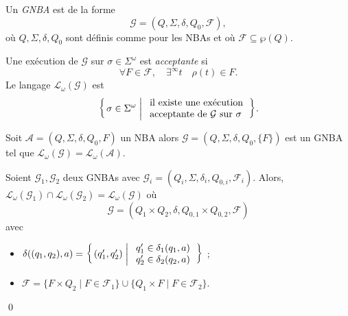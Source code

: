 \documentclass[./main]{subfiles}
\begin{document}
  \begin{defn}
    Un \textit{GNBA} est de la forme
    \[
    \mathcal{G} = (Q, \Sigma, \delta, Q_0, \mathcal{F})
    ,\]
    où $Q, \Sigma, \delta, Q_0$ sont définis comme pour les NBAs et où $\mathcal{F} \subseteq \wp(Q)$.

    Une exécution de $\mathcal{G}$ sur $\sigma \in \Sigma^\omega$ est \textit{acceptante} si
    \[
    \forall F \in \mathcal{F}, \quad \exists^\infty t \quad \rho(t) \in F
    .\]
    Le langage $\mathcal{L}_\omega(\mathcal{G})$ est 
    \[
    \mleft\{\,
    \sigma \in \Sigma^\omega\;\middle|\;
    \begin{array}{l}
      \text{il existe une exécution}\\
      \text{acceptante de $\mathcal{G}$ sur $\sigma$}
    \end{array}\,\mright\} 
    .\] 
  \end{defn}

  \begin{rmk}
    Soit $\mathcal{A} = (Q, \Sigma, \delta, Q_0, F)$ un NBA alors $\mathcal{G} = (Q, \Sigma, \delta, Q_0, \{F\})$ est un GNBA tel que $\mathcal{L}_\omega(\mathcal{G}) = \mathcal{L}_\omega(\mathcal{A})$.
  \end{rmk}

  \begin{lem}
    Soient $\mathcal{G}_1, \mathcal{G}_2$ deux GNBAs avec $\mathcal{G}_i = (Q_i, \Sigma, \delta_i, Q_{0,i}, \mathcal{F}_i)$.
    Alors, $\mathcal{L}_\omega(\mathcal{G}_1) \cap \mathcal{L}_\omega(\mathcal{G}_2) = \mathcal{L}_\omega(\mathcal{G})$ où 
    \[
    \mathcal{G} = (Q_1 \times Q_2, \delta, Q_{0,1} \times Q_{0,2}, \mathcal{F})
    \] 
    avec
    \begin{itemize}
      \item $\delta((q_1, q_2), a) = \mleft\{\,(q_1', q_2') \;\middle|\; 
        \begin{array}{l}
          q_1' \in \delta_1(q_1, a)\\
          q_2' \in \delta_2(q_2, a)\\
        \end{array}\,\mright\} $ ;
      \item $\mathcal{F} = \{F \times Q_2  \mid F \in \mathcal{F}_1\} \cup \{Q_1 \times F  \mid F \in \mathcal{F}_2\}$.
    \end{itemize}
    \qed
  \end{lem}
\end{document}

